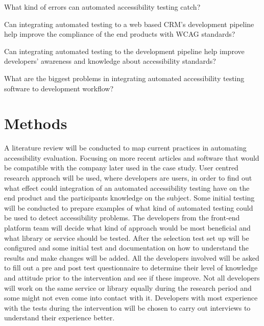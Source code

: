 \documentclass{thesis_proposal}
\begin{document}
\begin{RQlist}
    \item What kind of errors can automated accessibility testing catch?
    \item Can integrating automated testing to a web based CRM’s development pipeline help improve the compliance of the end products with WCAG standards?
    \item Can integrating automated testing to the development pipeline help improve developers’ awareness and knowledge about accessibility standards?
    \item What are the biggest problems in integrating automated accessibility testing software to development workflow?
\end{RQlist}

\section{Methods}
A literature review will be conducted to map current practices in automating accessibility evaluation. Focusing on more recent articles and software that would be compatible with the company later used in the case study.
User centred research approach will be used, where developers are users, in order to find out what effect could integration of an automated accessibility testing have on the end product and the participants knowledge on the subject.
Some initial testing will be conducted to prepare examples of what kind of automated testing could be used to detect accessibility problems. The developers from the front-end platform team will decide what kind of approach would be most beneficial and what library or service should be tested.
After the selection test set up will be configured and some initial test and documentation on how to understand the results and make changes will be added.
All the developers involved will be asked to fill out a pre and post test questionnaire to determine their level of knowledge and attitude prior to the intervention and see if these improve. Not all developers will work on the same service or library equally during the research period and some might not even come into contact with it. Developers with most experience with the tests during the intervention will be chosen to carry out interviews to understand their experience better.
\end{document}
